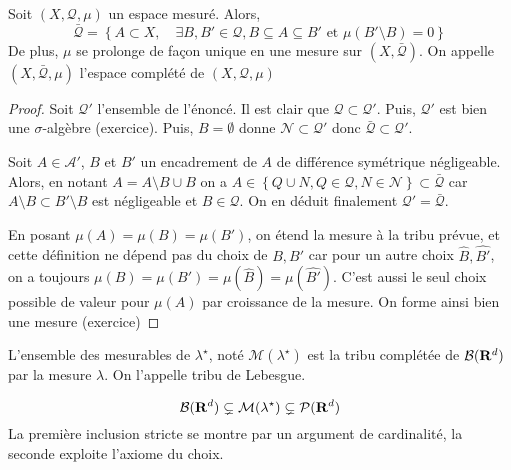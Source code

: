 \begin{prop}
    Soit $(X, \mathcal  Q, \mu)$ un espace mesuré. Alors, \[
        \bar{\mathcal  Q} = \left\{ A\subset X, \quad  \exists B,B' \in  \mathcal  Q, B\subseteq A\subseteq B'\text{ et } \mu(B'\setminus  B)=0 \right\} 
    \] 
    De plus, $\mu$ se prolonge de façon unique en une mesure sur  $(X, \bar{\mathcal  Q})$. On appelle $(X, \bar{\mathcal  Q}, \mu)$ l'espace complété de $(X, \mathcal  Q, \mu)$
\end{prop}

\begin{proof}
    Soit $\mathcal  Q'$ l'ensemble de l'énoncé. Il est clair que $\mathcal  Q\subset \mathcal  Q'$. Puis, $\mathcal  Q'$ est bien une $\sigma$-algèbre (exercice). Puis,  $B=\emptyset$ donne  $\mathcal  N\subset  \mathcal  Q'$ donc $\bar{\mathcal  Q}\subset \mathcal  Q'$.

    Soit $A \in  \mathcal A'$, $B$ et  $B'$ un encadrement de  $A$ de différence symétrique négligeable. Alors, en notant  $A=A \setminus  B\cup B$ on a $A \in  \left\{ Q\cup N, Q \in  \mathcal  Q, N \in  \mathcal  N \right\}\subset \bar{\mathcal  Q} $ car $A \setminus  B\subset B'\setminus  B$ est négligeable et $B \in  \mathcal  Q$. On en déduit finalement $\mathcal  Q'=\bar{\mathcal  Q}$.

    En posant $\mu(A)=\mu(B)=\mu(B')$, on étend la mesure à la tribu prévue, et cette définition ne dépend pas du choix de  $B, B'$ car pour un autre choix  $\hat{B},\hat{B'}$, on a toujours $\mu(B)=\mu(B')=\mu(\hat{B})=\mu(\hat{B'})$. C'est aussi le seul choix possible de valeur pour $\mu(A)$ par croissance de la mesure. On forme ainsi bien une mesure (exercice)
\end{proof}

\begin{thm}
    L'ensemble des mesurables de  $\lambda^\star$, noté  $\mathcal  M(\lambda^\star)$ est la tribu complétée de $\mathcal B(\mathbf R^d)$ par la mesure $\lambda$. On l'appelle tribu de Lebesgue.
\end{thm}

\begin{rem}
\[
    \mathcal  B(\mathbf R^d)\subsetneq \mathcal  M(\lambda^\star) \subsetneq \mathcal  P(\mathbf R^d)
\] 
La première inclusion stricte se montre par un argument de cardinalité, la seconde exploite l'axiome du choix.
\end{rem}

